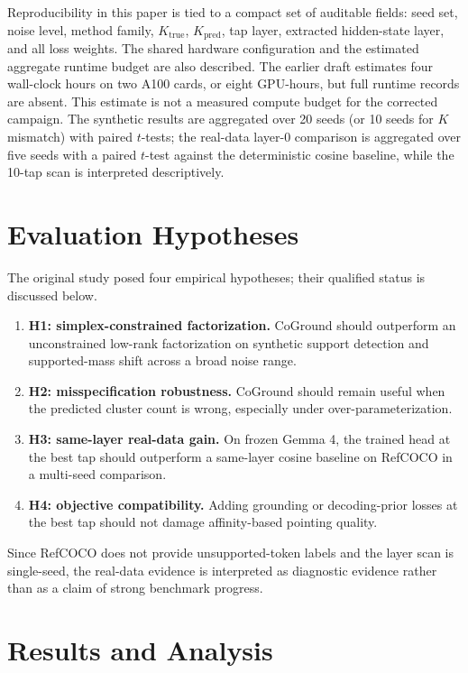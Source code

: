 \documentclass[11pt,a4paper]{article}
\begin{document}
Reproducibility in this paper is tied to a compact set of auditable fields: seed set, noise level, method family, $K_{\mathrm{true}}$, $K_{\mathrm{pred}}$, tap layer, extracted hidden-state layer, and all loss weights. The shared hardware configuration and the estimated aggregate runtime budget are also described. The earlier draft estimates four wall-clock hours on two A100 cards, or eight GPU-hours, but full runtime records are absent. This estimate is not a measured compute budget for the corrected campaign. The synthetic results are aggregated over 20 seeds (or 10 seeds for $K$ mismatch) with paired $t$-tests; the real-data layer-$0$ comparison is aggregated over five seeds with a paired $t$-test against the deterministic cosine baseline, while the 10-tap scan is interpreted descriptively.

\section{Evaluation Hypotheses}
\label{sec:hypotheses}

The original study posed four empirical hypotheses; their qualified status is discussed below.
\begin{enumerate}
    \item \textbf{H1: simplex-constrained factorization.} CoGround should outperform an unconstrained low-rank factorization on synthetic support detection and supported-mass shift across a broad noise range.
    \item \textbf{H2: misspecification robustness.} CoGround should remain useful when the predicted cluster count is wrong, especially under over-parameterization.
    \item \textbf{H3: same-layer real-data gain.} On frozen Gemma 4, the trained head at the best tap should outperform a same-layer cosine baseline on RefCOCO in a multi-seed comparison.
    \item \textbf{H4: objective compatibility.} Adding grounding or decoding-prior losses at the best tap should not damage affinity-based pointing quality.
\end{enumerate}

Since RefCOCO does not provide unsupported-token labels and the layer scan is single-seed, the real-data evidence is interpreted as diagnostic evidence rather than as a claim of strong benchmark progress.

\section{Results and Analysis}
\label{sec:results}
\end{document}
